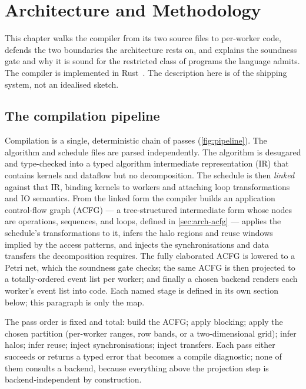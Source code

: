 \chapter{Architecture and Methodology}\label{ch:architecture}

This chapter walks the compiler from its two source files to per-worker code,
defends the two boundaries the architecture rests on, and explains the soundness
gate and why it is sound for the restricted class of programs the language
admits. The compiler is implemented in Rust~\cite{matsakis2014rust}. The description here is of the
shipping system, not an idealised sketch.

\section{The compilation pipeline}\label{sec:arch-pipeline}

Compilation is a single, deterministic chain of passes
(\cref{fig:pipeline}). The algorithm and schedule files are parsed
independently. The algorithm is desugared and type-checked into a typed
algorithm intermediate representation (IR) that contains kernels and dataflow but
no decomposition. The schedule is then \emph{linked} against that IR, binding
kernels to workers and attaching loop transformations and IO semantics. From the
linked form the compiler builds an application control-flow graph (ACFG) --- a
tree-structured intermediate form whose nodes are operations, sequences, and
loops, defined in \cref{sec:arch-acfg} --- applies the schedule's transformations
to it, infers the halo regions and reuse windows implied by the access patterns,
and injects the synchronisations and data transfers the decomposition requires.
The fully elaborated ACFG is lowered to a Petri net, which the soundness gate
checks; the same ACFG is then projected to a totally-ordered event list per
worker; and finally a chosen backend renders each worker's event list into code.
Each named stage is defined in its own section below; this paragraph is only the
map.



The pass order is fixed and total: build the ACFG; apply blocking; apply the
chosen partition (per-worker ranges, row bands, or a two-dimensional grid); infer
halos; infer reuse; inject synchronisations; inject transfers. Each pass either
succeeds or returns a typed error that becomes a compile diagnostic; none of them
consults a backend, because everything above the projection step is
backend-independent by construction.

